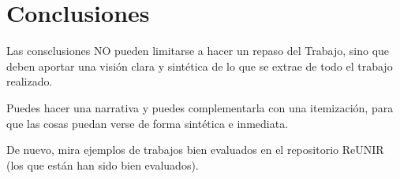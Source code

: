 \chapter{Conclusiones}

Las consclusiones NO pueden limitarse a hacer un repaso del Trabajo, sino que deben aportar una visión clara y sintética de lo que se extrae de todo el trabajo realizado.

Puedes hacer una narrativa y puedes complementarla con una itemización, para que las cosas puedan verse de forma sintética e inmediata.

De nuevo, mira ejemplos de trabajos bien evaluados en el repositorio ReUNIR (los que están han sido bien evaluados).
